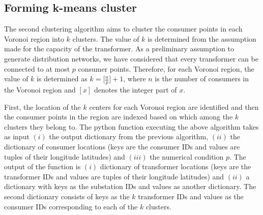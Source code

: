 \documentclass[12pt]{amsart}
\theoremstyle{definition}
\theoremstyle{remark} \newtheorem{remark}[theorem]{Remark} %
\numberwithin{equation}{section} %
\begin{document}
	\subsection{Forming k-means cluster}
	The second clustering algorithm aims to cluster the consumer points in each Voronoi region into $k$ clusters. The value of $k$ is determined from the assumption made for the capacity of the transformer. As a preliminary assumption to generate distribution networks, we have considered that every transformer can be connected to at most $p$ consumer points. Therefore, for each Voronoi region, the value of $k$ is determined as $k=\big[\frac{n}{p}\big]+1$, where $n$ is the number of consumers in the Voronoi region and $[x]$ denotes the integer part of $x$.
	\par
	First, the location of the $k$ centers for each Voronoi region are identified and then the consumer points in the region are indexed based on which among the $k$ clusters they belong to. The python function executing the above algorithm takes as input $(i)$ the output dictionary from the previous algorithm, $(ii)$ the dictionary of consumer locations (keys are the consumer IDs and values are tuples of their longitude latitudes) and $(iii)$ the numerical condition $p$. The output of the function is $(i)$ dictionary of transformer locations (keys are the transformer IDs and values are tuples of their longitude latitudes) and $(ii)$ a dictionary with keys as the substation IDs and values as another dictionary. The second dictionary consists of keys as the $k$ transformer IDs and values as the consumer IDs corresponding to each of the $k$ clusters.
	
\end{document}
